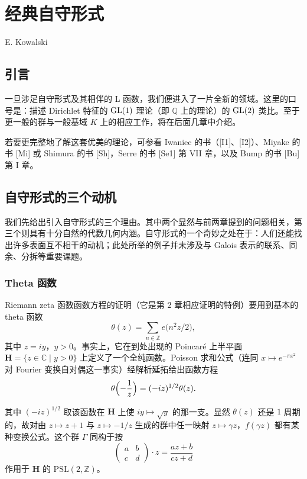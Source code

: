 \chapter{经典自守形式}\label{ch:03}

\begin{center}
E. Kowalski
\end{center}

\section{引言}\label{c3:sec:1}

一旦涉足自守形式及其相伴的 L 函数，我们便进入了一片全新的领域。这里的口号是：描述 Dirichlet 特征的 $\mathrm{GL}(1)$ 理论（即 $\mathbb{Q}$ 上的理论）的 $\mathrm{GL}(2)$ 类比。至于更一般的群与一般基域 $K$ 上的相应工作，将在后面几章中介绍。

若要更完整地了解这套优美的理论，可参看 Iwaniec 的书（[I1]、[I2]）、Miyake 的书 [Mi] 或 Shimura 的书 [Sh]，Serre 的书 [Se1] 第 VII 章，以及 Bump 的书 [Bu] 第 I 章。

\section{自守形式的三个动机}\label{c3:sec:2}

我们先给出引入自守形式的三个理由。其中两个显然与前两章提到的问题相关，第三个则具有十分自然的代数几何内涵。自守形式的一个奇妙之处在于：人们还能找出许多表面互不相干的动机；此处所举的例子并未涉及与 Galois 表示的联系、同余、分拆等重要课题。

\subsection{Theta 函数}\label{c3:sec:2.1}

Riemann zeta 函数函数方程的证明（它是第 2 章相应证明的特例）要用到基本的 theta 函数
\begin{equation}\tag{2.1}\label{c3:eq:2.1}
\theta(z)=\sum_{n\in\mathbb{Z}}e\bigl(n^{2}z/2\bigr),
\end{equation}
其中 $z=iy$，$y>0$。事实上，它在到处出现的 Poincaré 上半平面 $\mathbf{H}=\{z\in\mathbb{C}\mid y>0\}$ 上定义了一个全纯函数。Poisson 求和公式（连同 $x\mapsto e^{-\pi x^{2}}$ 对 Fourier 变换自对偶这一事实）经解析延拓给出函数方程
\[
\theta\Bigl(-\frac{1}{z}\Bigr)=(-iz)^{1/2}\theta(z).
\]

其中 $(-iz)^{1/2}$ 取该函数在 $\mathbf{H}$ 上使 $iy\mapsto\sqrt{y}$ 的那一支。显然 $\theta(z)$ 还是 $1$ 周期的，故对由 $z\mapsto z+1$ 与 $z\mapsto-1/z$ 生成的群中任一映射 $z\mapsto\gamma z$，$f(\gamma z)$ 都有某种变换公式。这个群 $\Gamma$ 同构于按
\begin{equation}\tag{2.2}\label{c3:eq:2.2}
\begin{pmatrix}a&b\\c&d\end{pmatrix}\cdot z=\frac{az+b}{cz+d}
\end{equation}
作用于 $\mathbf{H}$ 的 $\mathrm{PSL}(2,\mathbb{Z})$。

